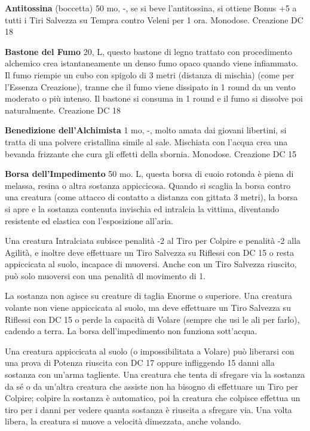 \documentclass[a4paper,11pt,twoside,openany]{book}
\begin{document}
\textbf{Antitossina} (boccetta) 50 mo, -, se si beve l'antitossina, si ottiene Bonus +5 a tutti i Tiri Salvezza su Tempra contro Veleni per 1 ora. Monodose. Creazione DC 18

\textbf{Bastone del Fumo} 20, L, questo bastone di legno trattato con procedimento alchemico crea istantaneamente un denso fumo opaco quando viene infiammato. Il fumo riempie un cubo con spigolo di 3 metri (distanza di mischia) (come per l'Essenza Creazione), tranne che il fumo viene dissipato in 1 round da un vento moderato o più intenso. Il bastone si consuma in 1 round e il fumo si dissolve
poi naturalmente. Creazione DC 18

\textbf{Benedizione dell'Alchimista} 1 mo, -, molto amata dai giovani libertini, si tratta di una polvere cristallina simile al sale. Mischiata con l'acqua crea una bevanda frizzante che cura gli effetti della sbornia. Monodose. Creazione DC 15

\textbf{Borsa dell'Impedimento} 50 mo. L, questa borsa di cuoio rotonda è piena di melassa, resina o altra sostanza appiccicosa. Quando si scaglia la borsa contro una creatura (come attacco di contatto a distanza con gittata 3 metri), la borsa si apre e la sostanza contenuta invischia ed intralcia la vittima, diventando resistente ed elastica con l'esposizione all'aria.

Una creatura Intralciata subisce penalità -2 al Tiro per Colpire e penalità -2 alla Agilità, e inoltre deve effettuare un Tiro Salvezza su Riflessi con DC 15 o resta appiccicata al suolo, incapace di muoversi. Anche con un Tiro Salvezza riuscito, può solo muoversi con una penalità dl movimento di 1.

La sostanza non agisce su creature di taglia Enorme o superiore. Una creatura volante non viene appiccicata al suolo, ma deve effettuare un Tiro Salvezza su Riflessi con DC 15 o perde la capacità di Volare (sempre che usi le ali per farlo), cadendo a terra. La borsa dell'impedimento non funziona sott'acqua.

Una creatura appiccicata al suolo (o impossibilitata a Volare) può liberarsi con una prova di Potenza riuscita con DC 17 oppure infliggendo 15 danni alla sostanza con un'arma tagliente. Una creatura che tenta di sfregare via la sostanza da sé o da un'altra creatura che assiste non ha bisogno di effettuare un Tiro per Colpire; colpire la sostanza è automatico, poi la creatura che colpisce effettua un tiro per i danni per vedere quanta sostanza è riuscita a sfregare via. Una volta libera, la creatura si muove a velocità dimezzata, anche volando.
\end{document}
